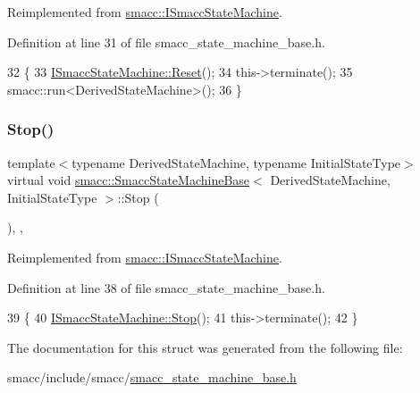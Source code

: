 Reimplemented from \hyperlink{classsmacc_1_1ISmaccStateMachine_ae175edef7aba48a1ac82e8401632c5fa}{smacc\+::\+I\+Smacc\+State\+Machine}.



Definition at line 31 of file smacc\+\_\+state\+\_\+machine\+\_\+base.\+h.


\begin{DoxyCode}
32     \{
33         \hyperlink{classsmacc_1_1ISmaccStateMachine_ae175edef7aba48a1ac82e8401632c5fa}{ISmaccStateMachine::Reset}();
34         this->terminate();
35         smacc::run<DerivedStateMachine>();
36     \}
\end{DoxyCode}
\mbox{\label{structsmacc_1_1SmaccStateMachineBase_a9c7c7b8d814a8cb1b741c7675dc2a9f7}} 
\subsubsection{\texorpdfstring{Stop()}{Stop()}}
{\footnotesize\ttfamily template$<$typename Derived\+State\+Machine, typename Initial\+State\+Type$>$ \\
virtual void \hyperlink{structsmacc_1_1SmaccStateMachineBase}{smacc\+::\+Smacc\+State\+Machine\+Base}$<$ Derived\+State\+Machine, Initial\+State\+Type $>$\+::Stop (\begin{DoxyParamCaption}{ }\end{DoxyParamCaption})\hspace{0.3cm}{\ttfamily [inline]}, {\ttfamily [override]}, {\ttfamily [virtual]}}



Reimplemented from \hyperlink{classsmacc_1_1ISmaccStateMachine_a8f353fcf0686b1dacb57458da882c89b}{smacc\+::\+I\+Smacc\+State\+Machine}.



Definition at line 38 of file smacc\+\_\+state\+\_\+machine\+\_\+base.\+h.


\begin{DoxyCode}
39     \{
40         \hyperlink{classsmacc_1_1ISmaccStateMachine_a8f353fcf0686b1dacb57458da882c89b}{ISmaccStateMachine::Stop}();
41         this->terminate();
42     \}
\end{DoxyCode}


The documentation for this struct was generated from the following file\+:\begin{DoxyCompactItemize}
\item 
smacc/include/smacc/\hyperlink{smacc__state__machine__base_8h}{smacc\+\_\+state\+\_\+machine\+\_\+base.\+h}\end{DoxyCompactItemize}
